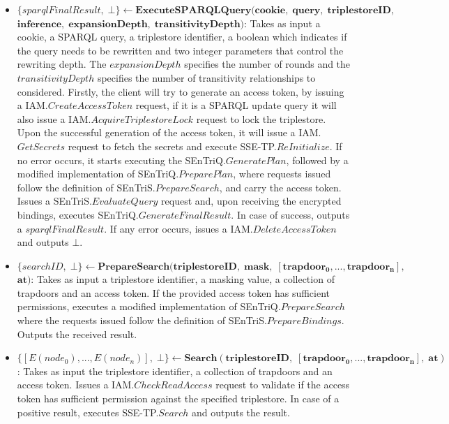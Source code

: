 \begin{definition}
\begin{itemize}
        \item $\{sparqlFinalResult, \; \bot\} \leftarrow \mathbf{ExecuteSPARQLQuery(cookie, \; query, \; triplestoreID,}$ \linebreak $\mathbf{ inference, \; expansionDepth, \; transitivityDepth)}$: Takes as input a cookie, a \linebreak \gls{SPARQL} query, a triplestore identifier, a boolean which indicates if the query needs to be rewritten and two integer parameters that control the rewriting depth. The $expansionDepth$ specifies the number of rounds and the $transitivityDepth$ specifies the number of transitivity relationships to considered.  Firstly, the client will try to generate an access token, by issuing a IAM.$CreateAccessToken$ request, if it is a \gls{SPARQL} update query it will also issue a IAM.$AcquireTriplestoreLock$ request to lock the triplestore. Upon the successful generation of the access token, it will issue a IAM.$GetSecrets$ request to fetch the secrets and execute SSE-TP.$ReInitialize$. If no error occurs, it starts executing the SEnTriQ.$GeneratePlan$, followed by a modified implementation of SEnTriQ.$PreparePlan$, where requests issued follow the definition of SEnTriS.$PrepareSearch$, and carry the access token. Issues a SEnTriS.$EvaluateQuery$ request and, upon receiving the encrypted bindings, executes SEnTriQ.$GenerateFinalResult$. In case of success, outputs a $sparqlFinalResult$. If any error occurs, issues a IAM.$DeleteAccessToken$ and outputs $\bot$.
        

        \item $\{ searchID, \; \bot \} \leftarrow \mathbf{PrepareSearch(triplestoreID, \; mask, \; [trapdoor_0, ..., trapdoor_n], }$ \linebreak $\mathbf{ at)}$: Takes as input a triplestore identifier, a masking value, a collection of trapdoors and an access token. If the provided access token has sufficient permissions, executes a modified implementation of SEnTriQ.$PrepareSearch$ where the requests issued follow the definition of SEnTriS.$PrepareBindings$. Outputs the received result.

        \item $\{[E(node_0), ..., E(node_n)], \; \bot\} \leftarrow \mathbf{Search(triplestoreID, \; [trapdoor_0, ..., trapdoor_n], \; at)}$: \linebreak Takes as input the triplestore identifier, a collection of trapdoors and an access token. Issues a IAM.$CheckReadAccess$ request to validate if the access token has sufficient permission against the specified triplestore. In case of a positive result, executes SSE-TP.$Search$ and outputs the result.


\end{itemize}
\end{definition}
